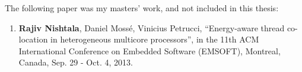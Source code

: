 \noindent {} The following paper was my masters' work, and not included in this thesis:

\begin{enumerate}[leftmargin=*]  

     \item[{\small {\circled{1}}}] \textbf{Rajiv Nishtala}, Daniel Moss\'e,
        Vinicius Petrucci, ``\textsf{Energy-aware thread co-location in heterogeneous
        multicore processors}'', in the 11th ACM International Conference on Embedded
        Software ({EMSOFT}), Montreal, Canada, Sep. 29 - Oct. 4, 2013.
    
\end{enumerate}
